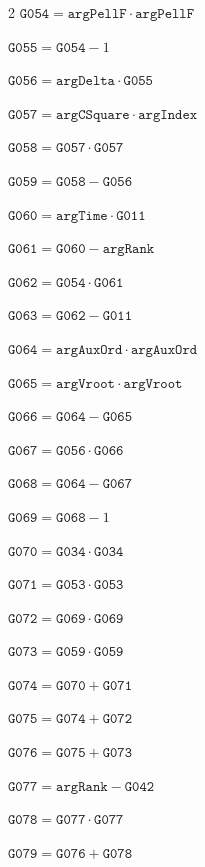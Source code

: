 \documentclass[10pt]{article}
\begin{document}
\begin{multicols}{2}
\noindent $\mathtt{G054}=\mathtt{argPellF}\cdot \mathtt{argPellF}$\par
\noindent $\mathtt{G055}=\mathtt{G054}-1$\par
\noindent $\mathtt{G056}=\mathtt{argDelta}\cdot \mathtt{G055}$\par
\noindent $\mathtt{G057}=\mathtt{argCSquare}\cdot \mathtt{argIndex}$\par
\noindent $\mathtt{G058}=\mathtt{G057}\cdot \mathtt{G057}$\par
\noindent $\mathtt{G059}=\mathtt{G058}-\mathtt{G056}$\par
\noindent $\mathtt{G060}=\mathtt{argTime}\cdot \mathtt{G011}$\par
\noindent $\mathtt{G061}=\mathtt{G060}-\mathtt{argRank}$\par
\noindent $\mathtt{G062}=\mathtt{G054}\cdot \mathtt{G061}$\par
\noindent $\mathtt{G063}=\mathtt{G062}-\mathtt{G011}$\par
\noindent $\mathtt{G064}=\mathtt{argAuxOrd}\cdot \mathtt{argAuxOrd}$\par
\noindent $\mathtt{G065}=\mathtt{argVroot}\cdot \mathtt{argVroot}$\par
\noindent $\mathtt{G066}=\mathtt{G064}-\mathtt{G065}$\par
\noindent $\mathtt{G067}=\mathtt{G056}\cdot \mathtt{G066}$\par
\noindent $\mathtt{G068}=\mathtt{G064}-\mathtt{G067}$\par
\noindent $\mathtt{G069}=\mathtt{G068}-1$\par
\noindent $\mathtt{G070}=\mathtt{G034}\cdot \mathtt{G034}$\par
\noindent $\mathtt{G071}=\mathtt{G053}\cdot \mathtt{G053}$\par
\noindent $\mathtt{G072}=\mathtt{G069}\cdot \mathtt{G069}$\par
\noindent $\mathtt{G073}=\mathtt{G059}\cdot \mathtt{G059}$\par
\noindent $\mathtt{G074}=\mathtt{G070}+\mathtt{G071}$\par
\noindent $\mathtt{G075}=\mathtt{G074}+\mathtt{G072}$\par
\noindent $\mathtt{G076}=\mathtt{G075}+\mathtt{G073}$\par
\noindent $\mathtt{G077}=\mathtt{argRank}-\mathtt{G042}$\par
\noindent $\mathtt{G078}=\mathtt{G077}\cdot \mathtt{G077}$\par
\noindent $\mathtt{G079}=\mathtt{G076}+\mathtt{G078}$\par

\end{multicols}
\end{document}
